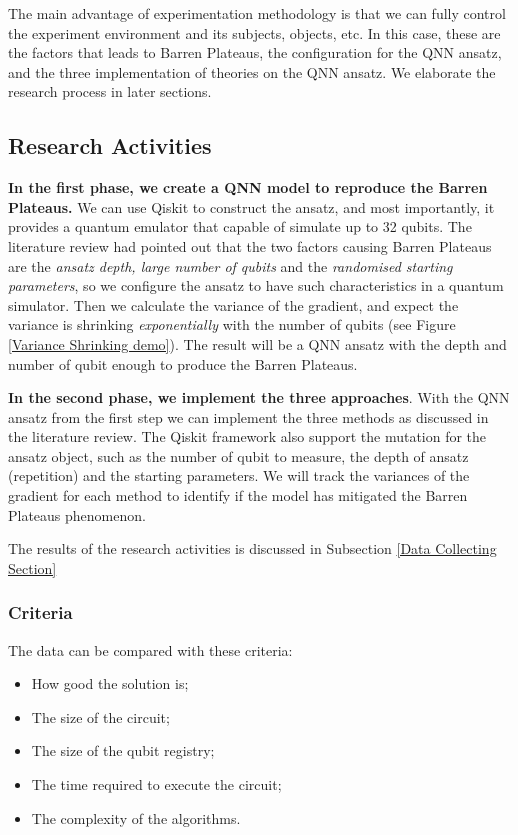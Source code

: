 The main advantage of experimentation methodology is that we can fully control the experiment environment and its subjects, objects, etc.
In this case, these are the factors that leads to Barren Plateaus, the configuration for the QNN ansatz, and the three implementation of theories on the QNN ansatz.
We elaborate the research process in later sections.

\subsection{Research Activities}
\label{Research Activities section}
\textbf{In the first phase, we create a QNN model to reproduce the Barren Plateaus.} 
We can use Qiskit \cite{Qiskit} to construct the ansatz, and most importantly, it provides a quantum emulator that capable of simulate up to 32 qubits.
The literature review had pointed out that the two factors causing Barren Plateaus are the \textit{ansatz depth, large number of qubits} and the \textit{randomised starting parameters}, so we configure the ansatz to have such characteristics in a quantum simulator.
Then we calculate the variance of the gradient, and expect the variance is shrinking \textit{exponentially} with the number of qubits (see Figure \ref{Variance Shrinking demo}).
The result will be a QNN ansatz with the depth and number of qubit enough to produce the Barren Plateaus.

\textbf{In the second phase, we implement the three approaches}.
With the QNN ansatz from the first step we can implement the three methods as discussed in the literature review.
The Qiskit framework also support the mutation for the ansatz object, such as the number of qubit to measure, the depth of ansatz (repetition) and the starting parameters.
We will track the variances of the gradient for each method to identify if the model has mitigated the Barren Plateaus phenomenon.

The results of the research activities is discussed in Subsection \ref{Data Collecting Section}

\subsubsection{Criteria}
\label{Criteria section}
The data can be compared with these criteria:
\begin{itemize}
    \item How good the solution is;
    \item The size of the circuit;
    \item The size of the qubit registry;
    \item The time required to execute the circuit;
    \item The complexity of the algorithms.
\end{itemize}


